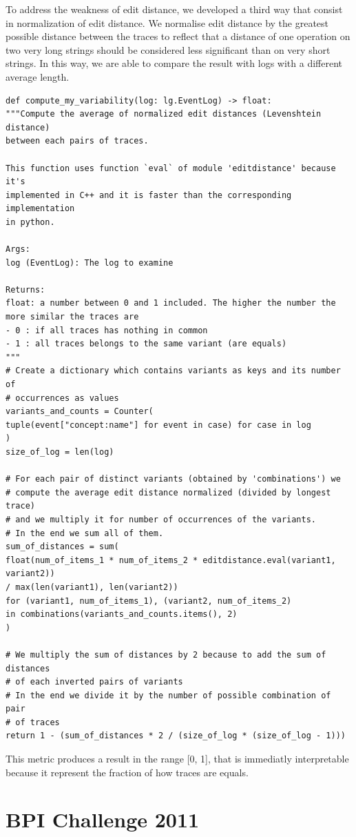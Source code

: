 \documentclass[12pt]{article}
\begin{document}
To address the weakness of edit distance, we developed a third way that consist in normalization of edit distance.  We normalise edit distance by the greatest possible distance between the traces to reflect that a distance of one operation on two very long strings should be considered less significant than on very short strings. In this way, we are able to compare the result with logs with a different average length.
\begin{verbatim}
def compute_my_variability(log: lg.EventLog) -> float:
"""Compute the average of normalized edit distances (Levenshtein distance)
between each pairs of traces.

This function uses function `eval` of module 'editdistance' because it's
implemented in C++ and it is faster than the corresponding implementation
in python.

Args:
log (EventLog): The log to examine

Returns:
float: a number between 0 and 1 included. The higher the number the
more similar the traces are
- 0 : if all traces has nothing in common
- 1 : all traces belongs to the same variant (are equals)
"""
# Create a dictionary which contains variants as keys and its number of
# occurrences as values
variants_and_counts = Counter(
tuple(event["concept:name"] for event in case) for case in log
)
size_of_log = len(log)

# For each pair of distinct variants (obtained by 'combinations') we
# compute the average edit distance normalized (divided by longest trace)
# and we multiply it for number of occurrences of the variants.
# In the end we sum all of them.
sum_of_distances = sum(
float(num_of_items_1 * num_of_items_2 * editdistance.eval(variant1, variant2))
/ max(len(variant1), len(variant2))
for (variant1, num_of_items_1), (variant2, num_of_items_2)
in combinations(variants_and_counts.items(), 2)
)

# We multiply the sum of distances by 2 because to add the sum of distances
# of each inverted pairs of variants
# In the end we divide it by the number of possible combination of pair
# of traces
return 1 - (sum_of_distances * 2 / (size_of_log * (size_of_log - 1)))
\end{verbatim}

This metric produces a result in the range [0, 1], that is immediatly interpretable because it represent the fraction of how traces are equals.


\section*{BPI Challenge 2011}
\end{document}
